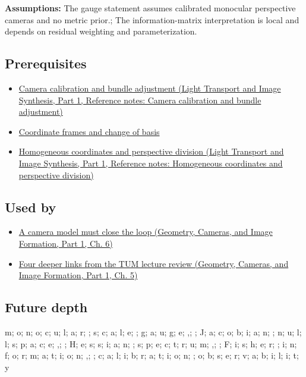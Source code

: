 \textbf{Assumptions:} The gauge statement assumes calibrated monocular perspective cameras and no metric prior.; The information-matrix interpretation is local and depends on residual weighting and parameterization.

\subsection{Prerequisites}\label{appendix-113f0267e5f4-prerequisites}

\hypertarget{appendix-113f0267e5f4-prerequisites}{}

\begin{itemize}
\tightlist
\item
  \href{../04-Light-Transport-and-Image-Synthesis-P01/main.pdf\#appendix-3ee9861904d5}{Camera calibration and bundle adjustment (Light Transport and Image Synthesis, Part 1, Reference notes: Camera calibration and bundle adjustment)}
\item
  \hyperref[appendix-1bae9457dbc3]{Coordinate frames and change of basis}
\item
  \href{../04-Light-Transport-and-Image-Synthesis-P01/main.pdf\#appendix-cb3b26862282}{Homogeneous coordinates and perspective division (Light Transport and Image Synthesis, Part 1, Reference notes: Homogeneous coordinates and perspective division)}
\end{itemize}

\subsection{Used by}\label{appendix-113f0267e5f4-used-by}

\hypertarget{appendix-113f0267e5f4-used-by}{}

\begin{itemize}
\tightlist
\item
  \href{../03-Geometry-Cameras-and-Image-Formation-P01/main.pdf\#02-foundations-ii-ch037-a-camera-model-must-close-the-loop}{A camera model must close the loop (Geometry, Cameras, and Image Formation, Part 1, Ch. 6)}
\item
  \href{../03-Geometry-Cameras-and-Image-Formation-P01/main.pdf\#02-foundations-ii-ch036-four-deeper-links-from-the-tum-lecture-review}{Four deeper links from the TUM lecture review (Geometry, Cameras, and Image Formation, Part 1, Ch. 5)}
\end{itemize}

\subsection{Future depth}\label{appendix-113f0267e5f4-future-depth}

\hypertarget{appendix-113f0267e5f4-future-depth}{}

m; o; n; o; c; u; l; a; r; ; s; c; a; l; e; ; g; a; u; g; e; ,; ; J; a; c; o; b; i; a; n; ; n; u; l; l; s; p; a; c; e; ,; ; H; e; s; s; i; a; n; ; s; p; e; c; t; r; u; m; ,; ; F; i; s; h; e; r; ; i; n; f; o; r; m; a; t; i; o; n; ,; ; c; a; l; i; b; r; a; t; i; o; n; ; o; b; s; e; r; v; a; b; i; l; i; t; y
